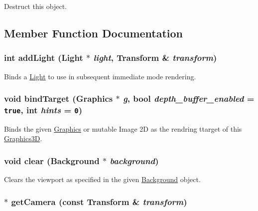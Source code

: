 Destruct this object. 

\subsection{Member Function Documentation}
\hypertarget{classm3g_1_1Graphics3D_e210cacb72c8540df86a6674e3c2dc4f}{
\subsubsection[{addLight}]{\setlength{\rightskip}{0pt plus 5cm}int addLight ({\bf Light} $\ast$ {\em light}, \/  {\bf Transform} \& {\em transform})}}
\label{classm3g_1_1Graphics3D_e210cacb72c8540df86a6674e3c2dc4f}


Binds a \hyperlink{classm3g_1_1Light}{Light} to use in subsequent immediate mode rendering. \hypertarget{classm3g_1_1Graphics3D_2173e179f4b2d7130cde46a48794ee66}{
\subsubsection[{bindTarget}]{\setlength{\rightskip}{0pt plus 5cm}void bindTarget ({\bf Graphics} $\ast$ {\em g}, \/  bool {\em depth\_\-buffer\_\-enabled} = {\tt true}, \/  int {\em hints} = {\tt 0})}}
\label{classm3g_1_1Graphics3D_2173e179f4b2d7130cde46a48794ee66}


Binds the given \hyperlink{classm3g_1_1Graphics}{Graphics} or mutable Image 2D as the rendring ttarget of this \hyperlink{classm3g_1_1Graphics3D}{Graphics3D}. \hypertarget{classm3g_1_1Graphics3D_21c4a68a53cfbe0a7cec05d5a56682bf}{
\subsubsection[{clear}]{\setlength{\rightskip}{0pt plus 5cm}void clear ({\bf Background} $\ast$ {\em background})}}
\label{classm3g_1_1Graphics3D_21c4a68a53cfbe0a7cec05d5a56682bf}


Clears the viewport as specified in the given \hyperlink{classm3g_1_1Background}{Background} object. \hypertarget{classm3g_1_1Graphics3D_570b81f426d1b2b5e8794cffb33422c6}{
\subsubsection[{getCamera}]{ $\ast$ getCamera (const {\bf Transform} \& {\em transform})}}
\label{classm3g_1_1Graphics3D_570b81f426d1b2b5e8794cffb33422c6}



